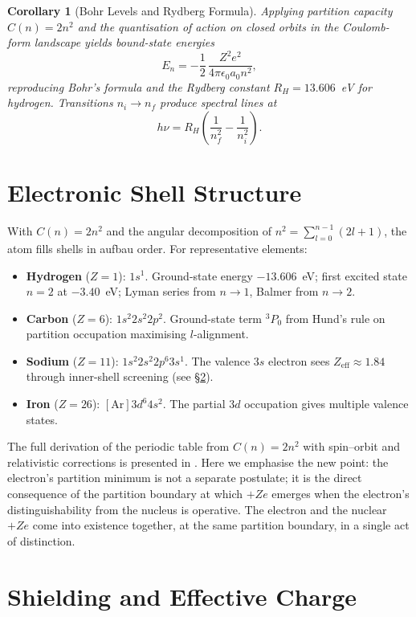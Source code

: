 \documentclass[11pt,a4paper]{article}
\newtheorem{corollary}[theorem]{Corollary}
\theoremstyle{definition}
\theoremstyle{remark}
\begin{document}
\begin{corollary}[Bohr Levels and Rydberg Formula]
\label{cor:bohr}
Applying partition capacity $C(n) = 2n^2$ and the quantisation of action on closed orbits in the Coulomb-form landscape yields bound-state energies
\[
E_n = -\frac{1}{2}\,\frac{Z^2 e^2}{4\pi\epsilon_0 a_0 n^2},
\]
reproducing Bohr's formula \citep{bohr1913} and the Rydberg constant $R_H = 13.606$~eV for hydrogen. Transitions $n_i \to n_f$ produce spectral lines at
\[
h\nu = R_H\left(\frac{1}{n_f^2} - \frac{1}{n_i^2}\right).
\]
\end{corollary}

\section{Electronic Shell Structure}
\label{sec:shells}

With $C(n) = 2n^2$ and the angular decomposition of $n^2 = \sum_{l=0}^{n-1}(2l+1)$, the atom fills shells in aufbau order. For representative elements:

\begin{itemize}[leftmargin=2em,itemsep=2pt]
  \item \textbf{Hydrogen} ($Z=1$): $1s^1$. Ground-state energy $-13.606$~eV; first excited state $n=2$ at $-3.40$~eV; Lyman series from $n\to 1$, Balmer from $n\to 2$.
  \item \textbf{Carbon} ($Z=6$): $1s^2 2s^2 2p^2$. Ground-state term $^3P_0$ from Hund's rule on partition occupation maximising $l$-alignment.
  \item \textbf{Sodium} ($Z=11$): $1s^2 2s^2 2p^6 3s^1$. The valence $3s$ electron sees $Z_\mathrm{eff}\approx 1.84$ through inner-shell screening (see \S\ref{sec:shielding}).
  \item \textbf{Iron} ($Z=26$): $[\mathrm{Ar}]3d^6 4s^2$. The partial $3d$ occupation gives multiple valence states.
\end{itemize}

The full derivation of the periodic table from $C(n) = 2n^2$ with spin--orbit and relativistic corrections is presented in \citep{sachikonye2025b}. Here we emphasise the new point: the electron's partition minimum is not a separate postulate; it is the direct consequence of the partition boundary at which $+Ze$ emerges when the electron's distinguishability from the nucleus is operative. The electron and the nuclear $+Ze$ come into existence together, at the same partition boundary, in a single act of distinction.

\section{Shielding and Effective Charge}
\label{sec:shielding}
\end{document}
